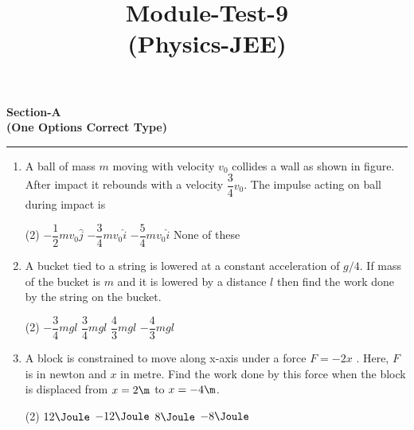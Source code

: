 \documentclass{article}
\title{Module-Test-9\\(Physics-JEE)}
\newcommand{\ans}{\textcolor{red!95}{\textit{\quad}}}
\begin{document}
\maketitle

\begin{center}
\textbf{Section-A\\(One Options Correct Type)}

  
\rule{\textwidth}{1 pt}
\end{center}

\begin{enumerate}
\item A ball of mass $m$ moving with velocity $v_0$ collides a wall as shown in figure. After impact it rebounds with a velocity $\dfrac{3}{4}v_0$. The impulse acting on ball during impact is
\begin{center}
\end{center}
\begin{tasks}(2)
	\task $-\dfrac{1}{2}mv_0\hat{j}$
	\task $-\dfrac{3}{4}mv_0\hat{i}$
	\task $-\dfrac{5}{4}mv_0\hat{i}$\ans
	\task None of these
\end{tasks}

\item A bucket tied to a string is lowered at a constant acceleration of $g/4$. If mass of the bucket is $m$ and it is lowered by a distance $l$ then find the work done by the string on the bucket.
\begin{tasks}(2)
	\task $-\dfrac{3}{4}mgl$\ans
	\task $\dfrac{3}{4}mgl$
	\task $\dfrac{4}{3}mgl$
	\task $-\dfrac{4}{3}mgl$
\end{tasks}

\item A block is constrained to move along x-axis under a force $F = - 2x$ . Here, $F$ is in newton and $x$ in
metre. Find the work done by this force when the block is displaced from $x = 2 \m$ to $x = - 4 \m$.
\begin{center}
\end{center}
\begin{tasks}(2)
	\task $12\Joule$
	\task $-12\Joule$\ans
	\task $8\Joule$
	\task $-8\Joule$
\end{tasks}


\end{enumerate}
\end{document}
